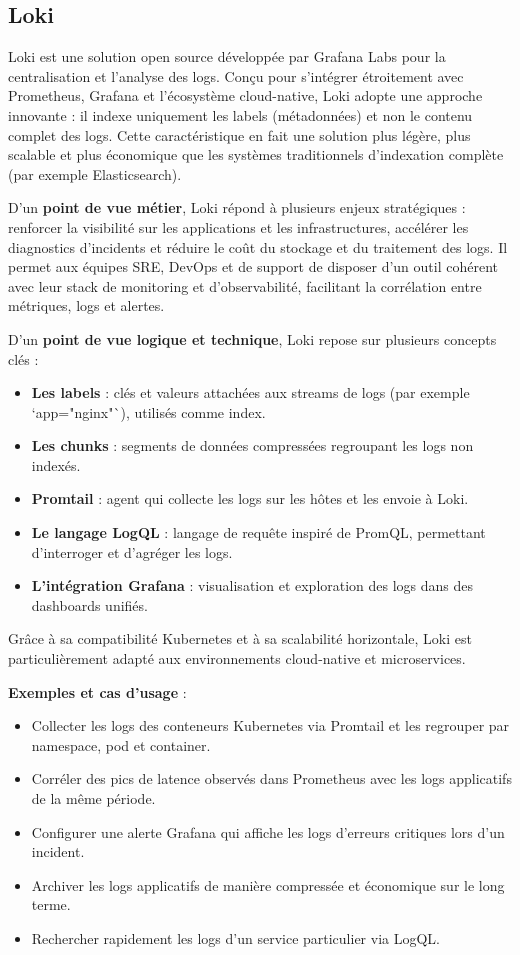 \subsection{Loki}

Loki est une solution open source développée par Grafana Labs pour la centralisation et l’analyse des logs. Conçu pour s’intégrer étroitement avec Prometheus, Grafana et l’écosystème cloud-native, Loki adopte une approche innovante  : il indexe uniquement les labels (métadonnées) et non le contenu complet des logs. Cette caractéristique en fait une solution plus légère, plus scalable et plus économique que les systèmes traditionnels d’indexation complète (par exemple Elasticsearch).

D’un \textbf{point de vue métier}, Loki répond à plusieurs enjeux stratégiques  : renforcer la visibilité sur les applications et les infrastructures, accélérer les diagnostics d’incidents et réduire le coût du stockage et du traitement des logs. Il permet aux équipes SRE, DevOps et de support de disposer d’un outil cohérent avec leur stack de monitoring et d’observabilité, facilitant la corrélation entre métriques, logs et alertes.

D’un \textbf{point de vue logique et technique}, Loki repose sur plusieurs concepts clés  :
\begin{itemize}
	\item \textbf{Les labels}  : clés et valeurs attachées aux streams de logs (par exemple `app="nginx"`), utilisés comme index.
	\item \textbf{Les chunks}  : segments de données compressées regroupant les logs non indexés.
	\item \textbf{Promtail}  : agent qui collecte les logs sur les hôtes et les envoie à Loki.
	\item \textbf{Le langage LogQL}  : langage de requête inspiré de PromQL, permettant d’interroger et d’agréger les logs.
	\item \textbf{L’intégration Grafana}  : visualisation et exploration des logs dans des dashboards unifiés.
\end{itemize}

Grâce à sa compatibilité Kubernetes et à sa scalabilité horizontale, Loki est particulièrement adapté aux environnements cloud-native et microservices.

\textbf{Exemples et cas d’usage} :
\begin{itemize}
	\item Collecter les logs des conteneurs Kubernetes via Promtail et les regrouper par namespace, pod et container.
	\item Corréler des pics de latence observés dans Prometheus avec les logs applicatifs de la même période.
	\item Configurer une alerte Grafana qui affiche les logs d’erreurs critiques lors d’un incident.
	\item Archiver les logs applicatifs de manière compressée et économique sur le long terme.
	\item Rechercher rapidement les logs d’un service particulier via LogQL.
\end{itemize}

